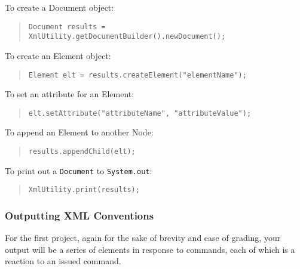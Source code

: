 \documentclass[12pt]{article}
\begin{document}
To create a Document object:
\begin{quote}
\begin{verbatim}
Document results = XmlUtility.getDocumentBuilder().newDocument();
\end{verbatim}
\end{quote}

To create an Element object:
\begin{quote}
\begin{verbatim}
Element elt = results.createElement("elementName");
\end{verbatim}
\end{quote}

To set an attribute for an Element:
\begin{quote}
\begin{verbatim}
elt.setAttribute("attributeName", "attributeValue");
\end{verbatim}
\end{quote}

To append an Element to another Node:
\begin{quote}
\begin{verbatim}
results.appendChild(elt);
\end{verbatim}
\end{quote}

To print out a \texttt{Document} to \texttt{System.out}:
\begin{quote}
\begin{verbatim}
XmlUtility.print(results);
\end{verbatim}
\end{quote}

\subsubsection{ Outputting XML Conventions \label{oxu}}

For the first project, again for the sake of brevity and ease of
grading,
your output will
be a series of elements in response to commands, each of which is a
reaction to an issued command.
\end{document}
